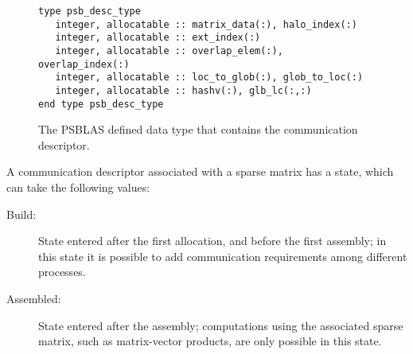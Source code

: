 \begin{figure}[h!]
  \begin{Sbox}
    \begin{minipage}[tl]{0.9\textwidth}
\begin{verbatim} 
type psb_desc_type 
   integer, allocatable :: matrix_data(:), halo_index(:)
   integer, allocatable :: ext_index(:)
   integer, allocatable :: overlap_elem(:), overlap_index(:)
   integer, allocatable :: loc_to_glob(:), glob_to_loc(:)
   integer, allocatable :: hashv(:), glb_lc(:,:)
end type psb_desc_type 
\end{verbatim}
    \end{minipage}
  \end{Sbox}
  \setlength{\fboxsep}{8pt}
  \begin{center}
    \fbox{\TheSbox}
  \end{center}
  \caption{\label{fig:desctype}The PSBLAS defined data type that
    contains the communication descriptor.}
\end{figure}

A communication descriptor associated with a sparse  matrix has a
state, which can take the following values:
\begin{description}
\item[Build:] State entered after the first allocation, and before the
  first assembly; in this state it is possible to add communication
  requirements among different processes. 
\item[Assembled:] State entered after the assembly; computations using
  the associated sparse matrix, such as matrix-vector products, are
  only possible   in this state.
\end{description}
